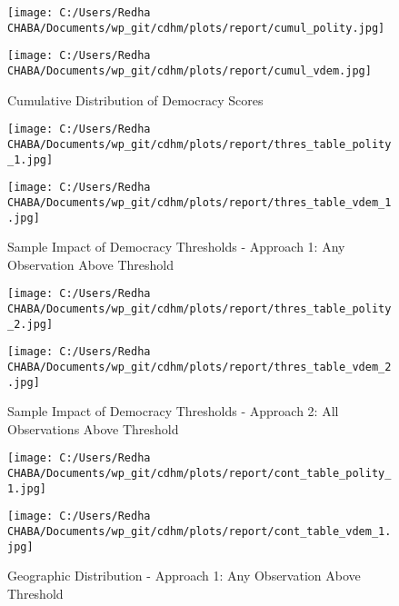 \documentclass[11pt]{article}
\begin{document}
\begin{figure}[H]
    \begin{center}
    \caption{Cumulative Distribution of Democracy Scores}
    \texttt{[image: C:/Users/Redha CHABA/Documents/wp\_git/cdhm/plots/report/cumul\_polity.jpg]}
        
    \vspace{1cm}

    \texttt{[image: C:/Users/Redha CHABA/Documents/wp\_git/cdhm/plots/report/cumul\_vdem.jpg]}
    \end{center}
\end{figure}

\begin{figure}[H]
    \begin{center}
    \caption{Sample Impact of Democracy Thresholds - Approach 1: Any Observation Above Threshold}
    \texttt{[image: C:/Users/Redha CHABA/Documents/wp\_git/cdhm/plots/report/thres\_table\_polity\_1.jpg]}
    
    \vspace{1cm}

    \texttt{[image: C:/Users/Redha CHABA/Documents/wp\_git/cdhm/plots/report/thres\_table\_vdem\_1.jpg]}
    
    \end{center}
\end{figure}

\begin{figure}[H]
    \begin{center}
    \caption{Sample Impact of Democracy Thresholds - Approach 2: All Observations Above Threshold}
    \texttt{[image: C:/Users/Redha CHABA/Documents/wp\_git/cdhm/plots/report/thres\_table\_polity\_2.jpg]}
        
    \vspace{1cm}

    \texttt{[image: C:/Users/Redha CHABA/Documents/wp\_git/cdhm/plots/report/thres\_table\_vdem\_2.jpg]}
    \end{center}
\end{figure}

\begin{figure}[H]
    \begin{center}
    \caption{Geographic Distribution - Approach 1: Any Observation Above Threshold}
    \texttt{[image: C:/Users/Redha CHABA/Documents/wp\_git/cdhm/plots/report/cont\_table\_polity\_1.jpg]}
    
    \vspace{1cm}

    \texttt{[image: C:/Users/Redha CHABA/Documents/wp\_git/cdhm/plots/report/cont\_table\_vdem\_1.jpg]}
    \end{center}
\end{figure}
\end{document}
